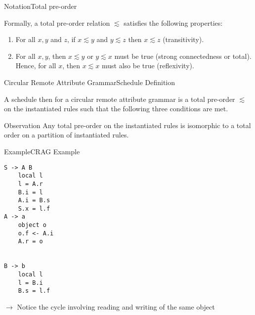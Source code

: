 \begin{frame}{Notation}{Total pre-order}

Formally, a total pre-order relation $\lesssim$ satisfies the following properties:

\begin{enumerate}
    \item For all $x,y$ and $z$, if $x\lesssim y$ and $y\lesssim z$ then $x\lesssim z$ (\alert{transitivity}).
    \item For all $x, y$, then $x\lesssim y$ or $y\lesssim x$ must be true (strong connectedness or \alert{total}). Hence, for all $x$, then $x\lesssim x$ must also be true (\alert{reflexivity}).
\end{enumerate}    

\end{frame}

\begin{frame}{Circular Remote Attribute Grammar}{Schedule Definition}
    
\begin{definition}
A schedule then for a circular remote attribute grammar is a \alert{total pre-order} $\lesssim$ on the \alert{instantiated rules} such that the following \alert{three conditions} are met.
\end{definition}


\begin{exampleblock}{Observation}
Any total pre-order on the instantiated rules is isomorphic to a total order on a partition of instantiated rules.
\end{exampleblock}

\end{frame}



\begin{frame}[fragile=singleslide]{Example}{CRAG Example}

\begin{multicols}{3}
\begin{Verbatim}[fontsize=\small]
S -> A B
    local l
    l = A.r
    B.i = l
    A.i = B.s
    S.x = l.f
A -> a
    object o
    o.f <- A.i
    A.r = o


B -> b
    local l
    l = B.i
    B.s = l.f
\end{Verbatim}
\end{multicols}

\newlinevspace

$\to$ Notice the \alert{cycle} involving reading and writing of the same object

\end{frame}


